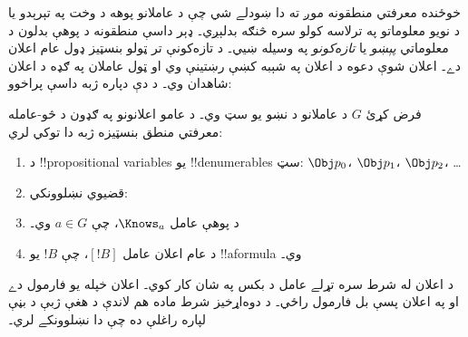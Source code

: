 \documentclass[../../../include/open-logic-section]{subfiles}
\begin{document}


خوځنده معرفتي منطقونه موږ ته دا ښودلے شي چې د عاملانو پوهه د وخت
په تېرېدو يا د نويو معلوماتو په ترلاسه کولو سره څنګه بدلېږي۔ ډېر
داسې منطقونه د پوهې بدلون د معلوماتي \emph{پېښو} يا
\emph{تازه‌کونو} په وسيله ښيي۔ د تازه‌کونې تر ټولو بنسټيز ډول
عام اعلان دے۔ اعلان شوې دعوه د اعلان په شېبه کښې رښتينې وي او
ټول عاملان په ګډه د اعلان شاهدان وي۔ د دې دپاره ژبه داسې پراخوو:

\begin{defn}
فرض کړئ $G$ د عاملانو د نښو يو سټ وي۔ د عامو اعلانونو په ګډون
د څو-عامله معرفتي منطق بنسټيزه ژبه دا توکي لري:
\begin{enumerate}
  \item د !!{propositional variable}s يو !!{denumerable}s سټ: $\Obj
    p_0$، $\Obj p_1$، $\Obj p_2$، \dots
  \item قضيوي نښلوونکي: \startycommalist
  \item د پوهې عامل $\Knows_a$، چې $a \in G$ وي۔
  \item د عام اعلان عامل $[!B]$، چې $!B$ يو !!a{formula} وي۔
\end{enumerate}
\end{defn}

د اعلان له شرط سره تړلے عامل د بکس په شان کار کوي۔ اعلان خپله
يو فارمول دے او په اعلان پسې بل فارمول راځي۔ د دوه‌اړخيز شرط ماده
هم لاندې د هغې ژبې د بڼې لپاره راغلې ده چې دا نښلوونکے لري۔
\end{document}
